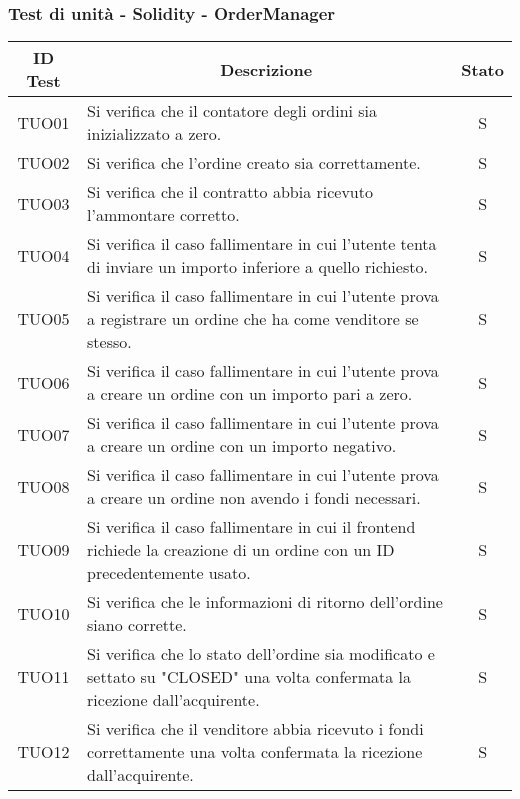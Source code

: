 
\subsubsection{Test di unità - Solidity - OrderManager}\label{subsubsection:TUO}
\begin{table}[H]
  \centering
  \renewcommand{\arraystretch}{1.8}
  \begin{tabular}{c|p{10cm}|c}
    \rowcolor[HTML]{125E28}
    \color[HTML]{FFFFFF}\textbf{ID Test}
          & \multicolumn{1}{c}{\color[HTML]{FFFFFF}\textbf{Descrizione}}
          & \color[HTML]{FFFFFF}\textbf{Stato}                                                                                                \\
    \hline
    TUO01 & Si verifica che il contatore degli ordini sia inizializzato a zero.                                                           & S \\
    TUO02 & Si verifica che l'ordine creato sia correttamente.                                                                            & S \\
    TUO03 & Si verifica che il contratto abbia ricevuto l'ammontare corretto.                                                             & S \\
    TUO04 & Si verifica il caso fallimentare in cui l'utente tenta di inviare un importo inferiore a quello richiesto.                    & S \\
    TUO05 & Si verifica il caso fallimentare in cui l'utente prova a registrare un ordine che ha come venditore se stesso.                & S \\
    TUO06 & Si verifica il caso fallimentare in cui l'utente prova a creare un ordine con un importo pari a zero.                         & S \\
    TUO07 & Si verifica il caso fallimentare in cui l'utente prova a creare un ordine con un importo negativo.                            & S \\
    TUO08 & Si verifica il caso fallimentare in cui l'utente prova a creare un ordine non avendo i fondi necessari.                       & S \\
    TUO09 & Si verifica il caso fallimentare in cui il frontend\glo{} richiede la creazione di un ordine con un ID precedentemente usato. & S \\
    TUO10 & Si verifica che le informazioni di ritorno dell'ordine siano corrette.                                                        & S \\
    TUO11 & Si verifica che lo stato dell'ordine sia modificato e settato su "CLOSED" una volta confermata la ricezione dall'acquirente.  & S \\
    TUO12 & Si verifica che il venditore abbia ricevuto i fondi correttamente una volta confermata la ricezione dall'acquirente.          & S \\
  \end{tabular}
\end{table}
